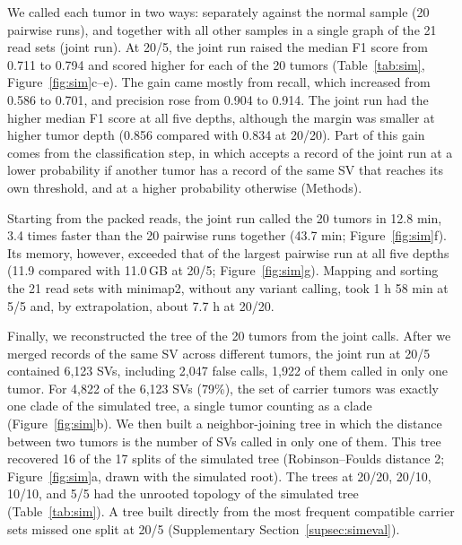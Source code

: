 We called each tumor in two ways: separately against the normal sample (20 pairwise runs), and together with all other samples in a single graph of the 21 read sets (joint run).
At 20/5, the joint run raised the median F1 score from 0.711 to 0.794 and scored higher for each of the 20 tumors (Table~\ref{tab:sim}, Figure~\ref{fig:sim}c--e).
The gain came mostly from recall, which increased from 0.586 to 0.701, and precision rose from 0.904 to 0.914.
The joint run had the higher median F1 score at all five depths, although the margin was smaller at higher tumor depth (0.856 compared with 0.834 at 20/20).
Part of this gain comes from the classification step, in which \tool{} accepts a record of the joint run at a lower probability if another tumor has a record of the same SV that reaches its own threshold, and at a higher probability otherwise (Methods).

Starting from the packed reads, the joint run called the 20 tumors in 12.8 min, 3.4 times faster than the 20 pairwise runs together (43.7 min; Figure~\ref{fig:sim}f).
Its memory, however, exceeded that of the largest pairwise run at all five depths (11.9 compared with 11.0\,GB at 20/5; Figure~\ref{fig:sim}g).
Mapping and sorting the 21 read sets with minimap2, without any variant calling, took 1 h 58 min at 5/5 and, by extrapolation, about 7.7 h at 20/20.

Finally, we reconstructed the tree of the 20 tumors from the joint calls.
After we merged records of the same SV across different tumors, the joint run at 20/5 contained 6,123 SVs, including 2,047 false calls, 1,922 of them called in only one tumor.
For 4,822 of the 6,123 SVs (79\%), the set of carrier tumors was exactly one clade of the simulated tree, a single tumor counting as a clade (Figure~\ref{fig:sim}b).
We then built a neighbor-joining tree in which the distance between two tumors is the number of SVs called in only one of them.
This tree recovered 16 of the 17 splits of the simulated tree (Robinson--Foulds distance 2; Figure~\ref{fig:sim}a, drawn with the simulated root).
The trees at 20/20, 20/10, 10/10, and 5/5 had the unrooted topology of the simulated tree (Table~\ref{tab:sim}).
A tree built directly from the most frequent compatible carrier sets missed one split at 20/5 (Supplementary Section~\ref{supsec:simeval}).
